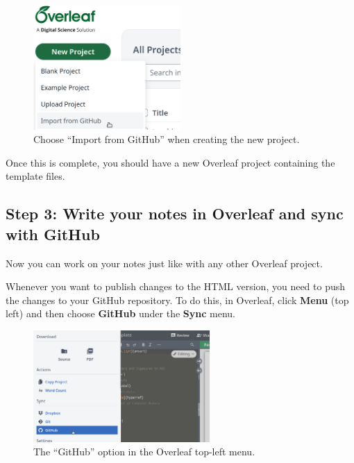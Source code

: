 \begin{figure}[h]
    \centering
    \includegraphics[width=0.5\textwidth]{img/overleaf_new.png}
    \caption{Choose ``Import from GitHub'' when creating the new project.}
    \label{fig:gh-overleaf-new}
\end{figure}

Once this is complete, you should have a new Overleaf project containing the template files.


\subsection{Step 3: Write your notes in Overleaf and sync with GitHub}
\label{ssec:sync}

Now you can work on your notes just like with any other Overleaf project.

Whenever you want to publish changes to the HTML version, you need to push the changes to your GitHub repository. To do this, in Overleaf, click \textbf{Menu} (top left) and then choose \textbf{GitHub} under the \textbf{Sync} menu.

\begin{figure}[h]
    \centering
    \includegraphics[width=0.6\textwidth]{img/overleaf_sync.png}
    \caption{The ``GitHub'' option in the Overleaf top-left menu.}
    \label{fig:gh-overleaf-sync}
\end{figure}

